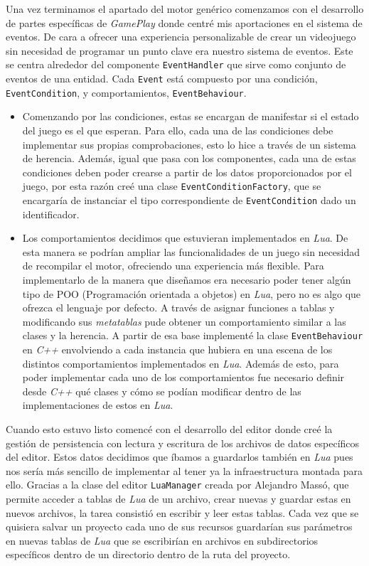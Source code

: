 Una vez terminamos el apartado del motor genérico comenzamos con el desarrollo de partes específicas de \textit{GamePlay} donde centré mis aportaciones en el sistema de eventos. De cara a ofrecer una experiencia personalizable de crear un videojuego sin necesidad de programar un punto clave era nuestro sistema de eventos. Este se centra alrededor del componente \texttt{EventHandler} que sirve como conjunto de eventos de una entidad. Cada \texttt{Event} está compuesto por una condición, \texttt{EventCondition}, y comportamientos, \texttt{EventBehaviour}.
\begin{itemize}
	\item Comenzando por las condiciones, estas se encargan de manifestar si el estado del juego es el que esperan. Para ello, cada una de las condiciones debe implementar sus propias comprobaciones, esto lo hice a través de un sistema de herencia. Además, igual que pasa con los componentes, cada una de estas condiciones deben poder crearse a partir de los datos proporcionados por el juego, por esta razón creé una clase \texttt{EventConditionFactory}, que se encargaría de instanciar el tipo correspondiente de \texttt{EventCondition} dado un identificador.
	\item Los comportamientos decidimos que estuvieran implementados en \textit{Lua}. De esta manera se podrían ampliar las funcionalidades de un juego sin necesidad de recompilar el motor, ofreciendo una experiencia más flexible. Para implementarlo de la manera que diseñamos era necesario poder tener algún tipo de POO (Programación orientada a objetos) en \textit{Lua}, pero no es algo que ofrezca el lenguaje por defecto. A través de asignar funciones a tablas y modificando sus \textit{metatablas} pude obtener un comportamiento similar a las clases y la herencia. A partir de esa base implementé la clase \texttt{EventBehaviour} en \textit{C++} envolviendo a cada instancia que hubiera en una escena de los distintos comportamientos implementados en \textit{Lua}. Además de esto, para poder implementar cada uno de los comportamientos fue necesario definir desde \textit{C++} qué clases y cómo se podían modificar dentro de las implementaciones de estos en \textit{Lua}.
\end{itemize}

\medskip

Cuando esto estuvo listo comencé con el desarrollo del editor donde creé la gestión de persistencia con lectura y escritura de los archivos de datos específicos del editor. Estos datos decidimos que íbamos a guardarlos también en \textit{Lua} pues nos sería más sencillo de implementar al tener ya la infraestructura montada para ello. Gracias a la clase del editor \texttt{LuaManager} creada por Alejandro Massó, que permite acceder a tablas de \textit{Lua} de un archivo, crear nuevas y guardar estas en nuevos archivos, la tarea consistió en escribir y leer estas tablas. Cada vez que se quisiera salvar un proyecto cada uno de sus recursos guardarían sus parámetros en nuevas tablas de \textit{Lua} que se escribirían en archivos en subdirectorios específicos dentro de un directorio  dentro de la ruta del proyecto.

